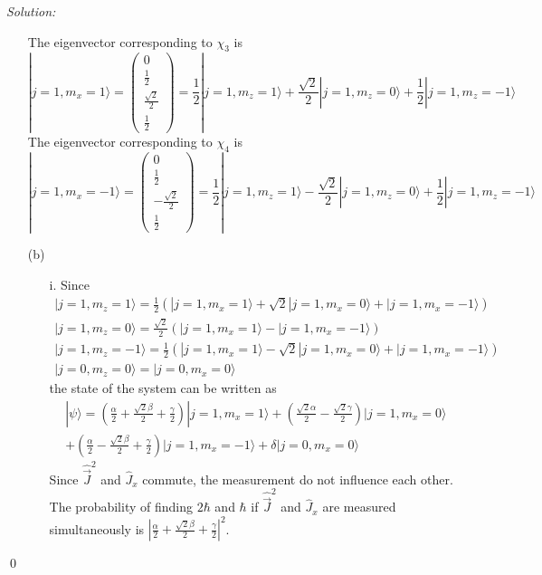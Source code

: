 \documentclass[10pt,a4paper]{article}
\newenvironment{sol}
    {\emph{Solution:}
    }
    {
    \qed
    }
\begin{document}
\begin{sol}
\begin{itemize}
\begin{equation}
\end{equation}
The eigenvector corresponding to $\chi_3$ is
\begin{equation}
|j=1,m_x=1\rangle=\left(\begin{array}{c}
0\\
\frac{1}{2}\\
\frac{\sqrt{2}}{2}\\
\frac{1}{2}
\end{array}\right)=\frac{1}{2}|j=1,m_z=1\rangle+\frac{\sqrt{2}}{2}|j=1,m_z=0\rangle+\frac{1}{2}|j=1,m_z=-1\rangle
\end{equation}
The eigenvector corresponding to $\chi_4$ is
\begin{equation}
|j=1,m_x=-1\rangle=\left(\begin{array}{c}
0\\
\frac{1}{2}\\
-\frac{\sqrt{2}}{2}\\
\frac{1}{2}
\end{array}\right)=\frac{1}{2}|j=1,m_z=1\rangle-\frac{\sqrt{2}}{2}|j=1,m_z=0\rangle+\frac{1}{2}|j=1,m_z=-1\rangle
\end{equation}
\item[(b)]
\begin{itemize}
\item[i.] Since
\begin{gather}
|j=1,m_z=1\rangle=\frac{1}{2}(|j=1,m_x=1\rangle+\sqrt{2}|j=1,m_x=0\rangle+|j=1,m_x=-1\rangle)\\
|j=1,m_z=0\rangle=\frac{\sqrt{2}}{2}(|j=1,m_x=1\rangle-|j=1,m_x=-1\rangle)\\
|j=1,m_z=-1\rangle=\frac{1}{2}(|j=1,m_x=1\rangle-\sqrt{2}|j=1,m_x=0\rangle+|j=1,m_x=-1\rangle)\\
|j=0,m_z=0\rangle=|j=0,m_x=0\rangle
\end{gather}
the state of the system can be written as
\begin{gather}
\nonumber|\psi\rangle=(\frac{\alpha}{2}+\frac{\sqrt{2}\beta}{2}+\frac{\gamma}{2})|j=1,m_x=1\rangle+(\frac{\sqrt{2}\alpha}{2}-\frac{\sqrt{2}\gamma}{2})|j=1,m_x=0\rangle\\
+(\frac{\alpha}{2}-\frac{\sqrt{2}\beta}{2}+\frac{\gamma}{2})|j=1,m_x=-1\rangle+\delta|j=0,m_x=0\rangle
\end{gather}
Since $\hat{\vec{J}}^2$ and $\hat{J}_x$ commute, the measurement do not influence each other. The probability of finding $2\hbar$ and $\hbar$ if $\hat{\vec{J}}^2$ and $\hat{J}_x$ are measured simultaneously is $|\frac{\alpha}{2}+\frac{\sqrt{2}\beta}{2}+\frac{\gamma}{2}|^2$.

\end{itemize}
\end{itemize}
\end{sol}
\end{document}
